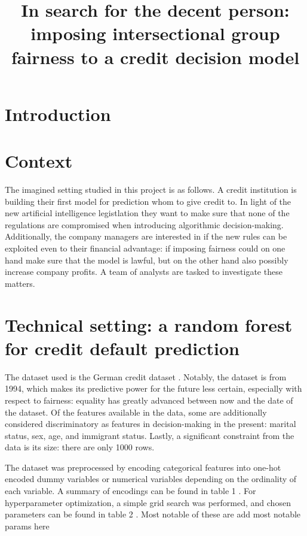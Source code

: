 \documentclass{article}
\title{In search for the decent person: imposing intersectional group fairness to a credit decision model}
\begin{document}
\maketitle

\section*{Introduction}


\section*{Context}

The imagined setting studied in this project is as follows. 
A credit institution is building their first model for prediction whom to give credit to.
In light of the new artificial intelligence legistlation they want to 
make sure that none of the regulations are compromised when introducing 
algorithmic decision-making. Additionally, the company managers are interested 
in if the new rules can be exploited even to their financial advantage: if 
imposing fairness could on one hand make sure that the model is lawful, but on 
the other hand also possibly increase company profits. A team of analysts are 
tasked to investigate these matters.

\section*{Technical setting: a random forest for credit default prediction}

The dataset used is the German credit dataset \cite{stanley}.
Notably, the dataset is from 1994, which makes its predictive power for the future 
less certain, especially with respect to fairness: equality has greatly advanced 
between now and the date of the dataset.
Of the features available in the data, some are additionally considered 
discriminatory as features in decision-making in the present: marital status, 
sex, age, and immigrant status. Lastly, a significant constraint from the data 
is its size: there are only 1000 rows. 

The dataset was preprocessed by encoding categorical features into one-hot encoded 
dummy variables or numerical variables depending on the ordinality of each variable.
A summary of encodings can be found in table 1 \cite{stanley}. For hyperparameter 
optimization, a simple grid search was performed, and chosen parameters can be found in table 2 \cite{stanley}.
Most notable of these are add most notable params here
\end{document}
